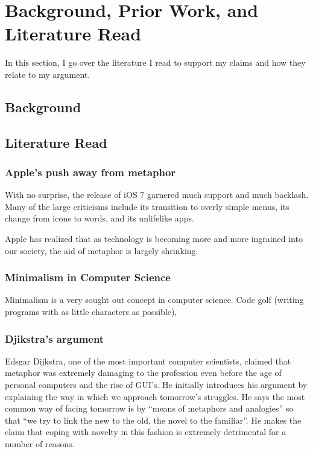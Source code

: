 \documentclass[11pt, oneside]{article}   	%
\begin{document}
\cite{bae16}

\section{Background, Prior Work, and Literature Read}

In this section, I go over the literature I read to support my claims and how they relate to my argument.

\subsection{Background}

\subsection{Literature Read}

\subsubsection{Apple's push away from metaphor}

With no surprise, the release of iOS 7 garnered much support and much backlash. Many of the large criticisms include its transition to overly simple menus, its change from icons to words, and its unlifelike apps. 

Apple has realized that as technology is becoming more and more ingrained into our society, the aid of metaphor is largely shrinking.

\subsubsection{Minimalism in Computer Science}
Minimalism is a very sought out concept in computer science. Code golf (writing programs with as little characters as possible), 

\subsubsection{Djikstra's argument}
Edsgar Dijkstra, one of the most important computer scientists, claimed that metaphor was extremely damaging to the profession even before the age of personal computers and the rise of GUI's. He initially introduces his argument by explaining the way in which we approach tomorrow's struggles. He says the most common way of facing tomorrow is by ``means of metaphors and analogies'' so that ``we try to link the new to the old, the novel to the familiar''. He makes the claim that coping with novelty in this fashion is extremely detrimental for a number of reasons.
\end{document}
